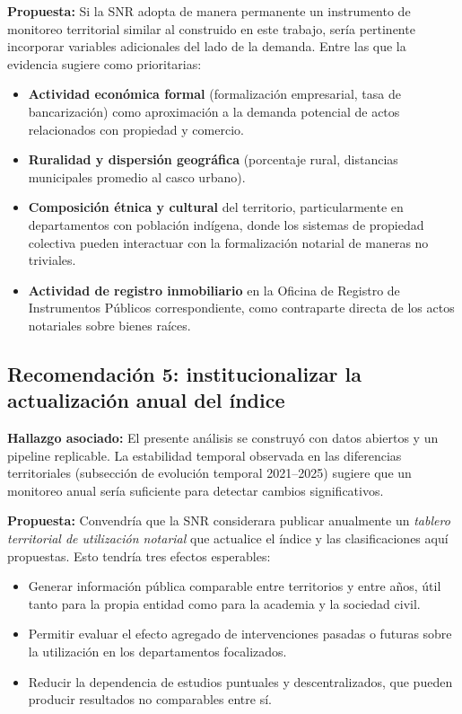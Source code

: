 \documentclass{article}
\begin{document}
\textbf{Propuesta:} Si la SNR adopta de manera permanente un
instrumento de monitoreo territorial similar al construido en este
trabajo, sería pertinente incorporar variables adicionales del lado
de la demanda. Entre las que la evidencia sugiere como prioritarias:

\begin{itemize}
    \item \textbf{Actividad económica formal} (formalización
    empresarial, tasa de bancarización) como aproximación a la
    demanda potencial de actos relacionados con propiedad y comercio.
    \item \textbf{Ruralidad y dispersión geográfica} (porcentaje
    rural, distancias municipales promedio al casco urbano).
    \item \textbf{Composición étnica y cultural} del territorio,
    particularmente en departamentos con población indígena, donde
    los sistemas de propiedad colectiva pueden interactuar con la
    formalización notarial de maneras no triviales.
    \item \textbf{Actividad de registro inmobiliario} en la Oficina
    de Registro de Instrumentos Públicos correspondiente, como
    contraparte directa de los actos notariales sobre bienes raíces.
\end{itemize}

\subsection{Recomendación 5: institucionalizar la actualización anual del índice}

\textbf{Hallazgo asociado:} El presente análisis se construyó con
datos abiertos y un pipeline replicable. La estabilidad temporal
observada en las diferencias territoriales (subsección de evolución
temporal 2021--2025) sugiere que un monitoreo anual sería suficiente
para detectar cambios significativos.

\textbf{Propuesta:} Convendría que la SNR considerara publicar
anualmente un \emph{tablero territorial de utilización notarial} que
actualice el índice y las clasificaciones aquí propuestas. Esto
tendría tres efectos esperables:

\begin{itemize}
    \item Generar información pública comparable entre territorios y
    entre años, útil tanto para la propia entidad como para la
    academia y la sociedad civil.
    \item Permitir evaluar el efecto agregado de intervenciones
    pasadas o futuras sobre la utilización en los departamentos
    focalizados.
    \item Reducir la dependencia de estudios puntuales y
    descentralizados, que pueden producir resultados no comparables
    entre sí.
\end{itemize}
\end{document}
